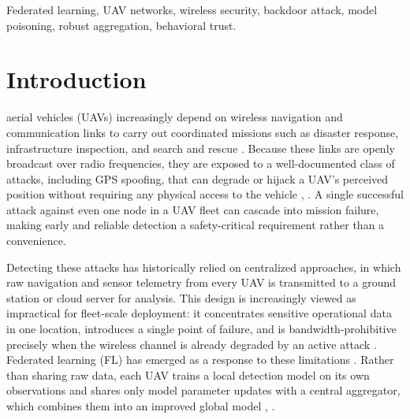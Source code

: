 \documentclass[journal]{IEEEtran}
\begin{document}
\begin{abstract}
additional client-side work. We compare against eight published
aggregation rules reimplemented on the identical pipeline. FLTrust, the
closest prior root-of-trust defense, leaves $+0.0787$ of lift and costs
utility relative to the honest baseline; Multi-Krum is competitive with
our behavioral trust under IID clients, a result we report rather than
obscure. What distinguishes the behavioral probe is that it needs no
estimate of how many clients are compromised, a condition under which
Multi-Krum degrades from $+0.0061$ to $+0.2837$, and that it names the
compromised aircraft rather than only excluding updates. We also report
the defense's principal failure: under client class-ratio skew the probe
stops firing, because suspicion measured against a cohort median is
masked by the honest cohort's own inflated variance, leaving the
coordinate-wise median backstop to carry what protection remains. All
results are obtained on a public software-defined-radio GPS spoofing
dataset partitioned into simulated UAV clients.
\end{abstract}

\begin{IEEEkeywords}
Federated learning, UAV networks, wireless security, backdoor attack, model poisoning, robust aggregation, behavioral trust.
\end{IEEEkeywords}

\section{Introduction}
 aerial vehicles (UAVs) increasingly depend on wireless navigation and communication links to carry out coordinated missions such as disaster response, infrastructure inspection, and search and rescue \cite{mekdad2023survey}. Because these links are openly broadcast over radio frequencies, they are exposed to a well-documented class of attacks, including GPS spoofing, that can degrade or hijack a UAV's perceived position without requiring any physical access to the vehicle \cite{mekdad2023survey}, \cite{chai2025navigation}. A single successful attack against even one node in a UAV fleet can cascade into mission failure, making early and reliable detection a safety-critical requirement rather than a convenience.

Detecting these attacks has historically relied on centralized approaches, in which raw navigation and sensor telemetry from every UAV is transmitted to a ground station or cloud server for analysis. This design is increasingly viewed as impractical for fleet-scale deployment: it concentrates sensitive operational data in one location, introduces a single point of failure, and is bandwidth-prohibitive precisely when the wireless channel is already degraded by an active attack \cite{udin2025federated}. Federated learning (FL) has emerged as a response to these limitations \cite{mcmahan2017communication}. Rather than sharing raw data, each UAV trains a local detection model on its own observations and shares only model parameter updates with a central aggregator, which combines them into an improved global model \cite{chai2025navigation}, \cite{udin2025federated}.
\end{document}
